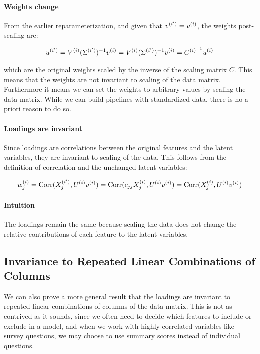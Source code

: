 \paragraph{Weights change}

From the earlier reparameterization, and given that $v^{(i')}=v^{(i)}$, the weights post-scaling are:

\begin{align}
    u^{(i')} = V^{(i)}(\Sigma^{(i')})^{-1}v^{(i)} = V^{(i)}(\Sigma^{(i')})^{-1}v^{(i)} = C^{{(i)}^{-1}}u^{(i)} \label{eq:weights_change}
\end{align}

which are the original weights scaled by the inverse of the scaling matrix \( C \). This means that the weights are not invariant to scaling of the data matrix. Furthermore it means we can set the weights to arbitrary values by scaling the data matrix.
While we can build pipelines with standardized data, there is no a priori reason to do so.

\paragraph{Loadings are invariant}

Since \gls{loadings} are correlations between the original features and the latent variables, they are invariant to scaling of the data.
This follows from the definition of correlation and the unchanged latent variables:

\begin{align}
    w^{(i)}_j = \operatorname{Corr}(X^{(i')}_j, U^{(i)}v^{(i)}) = \operatorname{Corr}(c_{jj}X^{(i)}_j, U^{(i)}v^{(i)}) = \operatorname{Corr}(X^{(i)}_j, U^{(i)}v^{(i)}) \label{eq:loading_invariant}
\end{align}

\paragraph{Intuition}
The \gls{loadings} remain the same because scaling the data does not change the relative contributions of each feature to the latent variables.

\subsection{Invariance to Repeated Linear Combinations of Columns}\label{subsubsec:invariance-to-linear-combinations}

We can also prove a more general result that the \gls{loadings} are invariant to repeated linear combinations of columns of the data matrix.
This is not as contrived as it sounds, since we often need to decide which features to include or exclude in a model, and when we work with highly correlated variables like survey questions, we may choose to use summary scores instead of individual questions.

